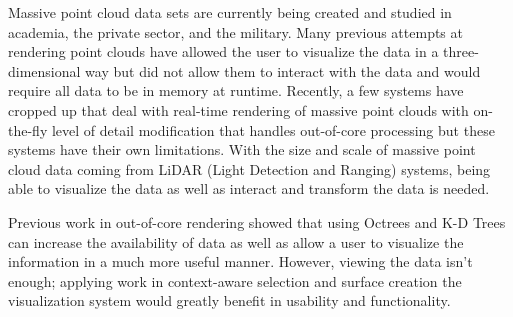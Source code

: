 \begin{abstractpage}
Massive point cloud data sets are currently being created and studied in
academia, the private sector, and the military. Many previous attempts at
rendering point clouds have allowed the user to visualize the data in a
three-dimensional way but did not allow them to interact with the data and would
require all data to be in memory at runtime. Recently, a few systems have
cropped up that deal with real-time rendering of massive point clouds with
on-the-fly level of detail modification that handles out-of-core processing but
these systems have their own limitations. With the size and scale of massive
point cloud data coming from LiDAR (Light Detection and Ranging) systems, being
able to visualize the data as well as interact and transform the data is needed.

Previous work in out-of-core rendering
\cite{3_wenzel2014out,4_goswami_zhang_pajarola_gobbetti_2010,5_richterdöllner_2010} showed
that using Octrees and K-D Trees can increase the availability of data as well as allow a user to visualize the information in a much more useful manner. However, viewing the
data isn't enough; applying work in context-aware selection \cite{2_yu:hal-01178051} and surface
creation \cite{1_VAST:VAST11:105-112} the visualization system would greatly benefit in usability
and functionality.
\end{abstractpage}
